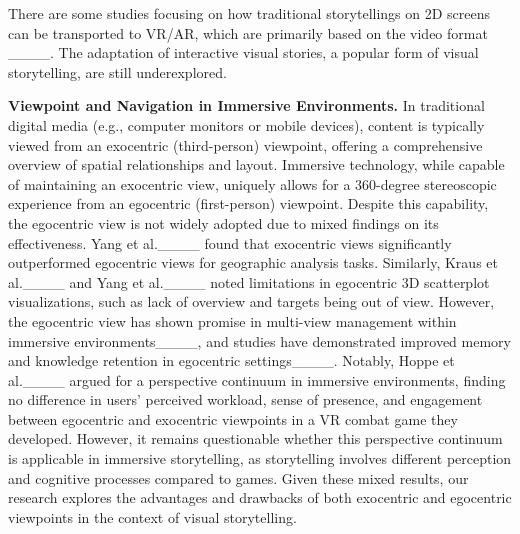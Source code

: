 There are some studies focusing on how traditional storytellings on 2D screens can be transported to VR/AR, which are primarily based on the video format ____. The adaptation of interactive visual stories, a popular form of visual storytelling, are still underexplored. 

\noindent\textbf{Viewpoint and Navigation in Immersive Environments.}
In traditional digital media (e.g., computer monitors or mobile devices), content is typically viewed from an exocentric (third-person) viewpoint, offering a comprehensive overview of spatial relationships and layout. Immersive technology, while capable of maintaining an exocentric view, uniquely allows for a 360-degree stereoscopic experience from an egocentric (first-person) viewpoint. Despite this capability, the egocentric view is not widely adopted due to mixed findings on its effectiveness. 
Yang et al.____ found that exocentric views significantly outperformed egocentric views for geographic analysis tasks. Similarly, Kraus et al.____ and Yang et al.____ noted limitations in egocentric 3D scatterplot visualizations, such as lack of overview and targets being out of view. 
However, the egocentric view has shown promise in multi-view management within immersive environments____, and studies have demonstrated improved memory and knowledge retention in egocentric settings____. 
{Notably, Hoppe et al.____ argued for a perspective continuum in immersive environments, finding no difference in users' perceived workload, sense of presence, and engagement between egocentric and exocentric viewpoints in a VR combat game they developed. However, it remains questionable whether this perspective continuum is applicable in immersive storytelling, as storytelling involves different perception and cognitive processes compared to games.} 
Given these mixed results, our research explores the advantages and drawbacks of both exocentric and egocentric viewpoints in the context of visual storytelling.

